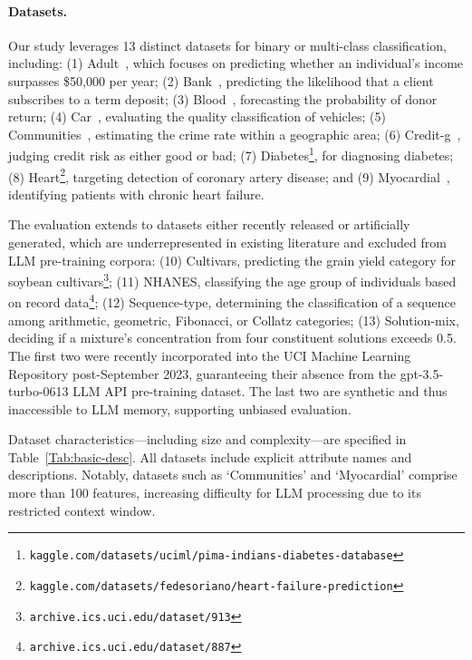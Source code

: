 \paragraph{Datasets.}
Our study leverages 13 distinct datasets for binary or multi-class classification, including: (1) Adult~\cite{asuncion2007uci}, which focuses on predicting whether an individual's income surpasses \$50,000 per year; (2) Bank~\cite{moro2014data}, predicting the likelihood that a client subscribes to a term deposit; (3) Blood~\cite{yeh2009knowledge}, forecasting the probability of donor return; (4) Car~\cite{kadra2021well}, evaluating the quality classification of vehicles; (5) Communities~\cite{misc_communities_and_crime_183}, estimating the crime rate within a geographic area; (6) Credit-g~\cite{kadra2021well}, judging credit risk as either good or bad; (7) Diabetes\footnote{\texttt{kaggle.com/datasets/uciml/pima-indians-diabetes-database}}, for diagnosing diabetes; (8) Heart\footnote{\texttt{kaggle.com/datasets/fedesoriano/heart-failure-prediction}}, targeting detection of coronary artery disease; and (9) Myocardial~\cite{misc_myocardial_infarction_complications_579}, identifying patients with chronic heart failure.

The evaluation extends to datasets either recently released or artificially generated, which are underrepresented in existing literature and excluded from LLM pre-training corpora: (10) Cultivars, predicting the grain yield category for soybean cultivars\footnote{\texttt{archive.ics.uci.edu/dataset/913}}; (11) NHANES, classifying the age group of individuals based on record data\footnote{\texttt{archive.ics.uci.edu/dataset/887}}; (12) Sequence-type, determining the classification of a sequence among arithmetic, geometric, Fibonacci, or Collatz categories; (13) Solution-mix, deciding if a mixture's concentration from four constituent solutions exceeds 0.5. The first two were recently incorporated into the UCI Machine Learning Repository post-September 2023, guaranteeing their absence from the gpt-3.5-turbo-0613 LLM API pre-training dataset. The last two are synthetic and thus inaccessible to LLM memory, supporting unbiased evaluation.

Dataset characteristics—including size and complexity—are specified in Table~\ref{Tab:basic-desc}.
All datasets include explicit attribute names and descriptions. Notably, datasets such as `Communities' and `Myocardial' comprise more than 100 features, increasing difficulty for LLM processing due to its restricted context window.

